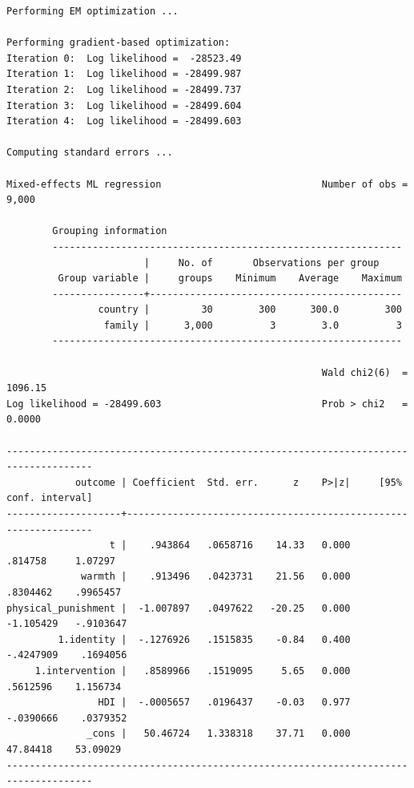 \documentclass[
  letterpaper,
  DIV=11,
  numbers=noendperiod]{scrreprt}
\begin{document}
\begin{verbatim}
Performing EM optimization ...

Performing gradient-based optimization: 
Iteration 0:  Log likelihood =  -28523.49  
Iteration 1:  Log likelihood = -28499.987  
Iteration 2:  Log likelihood = -28499.737  
Iteration 3:  Log likelihood = -28499.604  
Iteration 4:  Log likelihood = -28499.603  

Computing standard errors ...

Mixed-effects ML regression                            Number of obs =   9,000

        Grouping information
        -------------------------------------------------------------
                        |     No. of       Observations per group
         Group variable |     groups    Minimum    Average    Maximum
        ----------------+--------------------------------------------
                country |         30        300      300.0        300
                 family |      3,000          3        3.0          3
        -------------------------------------------------------------

                                                       Wald chi2(6)  = 1096.15
Log likelihood = -28499.603                            Prob > chi2   =  0.0000

-------------------------------------------------------------------------------------
            outcome | Coefficient  Std. err.      z    P>|z|     [95% conf. interval]
--------------------+----------------------------------------------------------------
                  t |    .943864   .0658716    14.33   0.000      .814758     1.07297
             warmth |    .913496   .0423731    21.56   0.000     .8304462    .9965457
physical_punishment |  -1.007897   .0497622   -20.25   0.000    -1.105429   -.9103647
         1.identity |  -.1276926   .1515835    -0.84   0.400    -.4247909    .1694056
     1.intervention |   .8589966   .1519095     5.65   0.000     .5612596    1.156734
                HDI |  -.0005657   .0196437    -0.03   0.977    -.0390666    .0379352
              _cons |   50.46724   1.338318    37.71   0.000     47.84418    53.09029
-------------------------------------------------------------------------------------


\end{verbatim}
\end{document}
